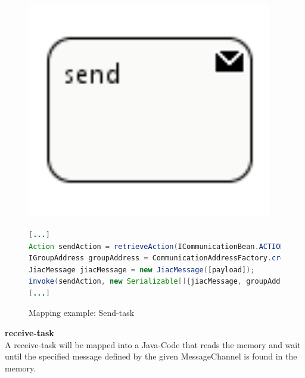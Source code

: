 \begin{figure}[h]
\begin{minipage}[c]{0.3\textwidth}
\includegraphics[width=0.95\textwidth]{images/mapping/sendTask.png}
\end{minipage}
\begin{minipage}[c]{0.7\textwidth}
\begin{lstlisting}[language=Java]
[...]
Action sendAction = retrieveAction(ICommunicationBean.ACTION_SEND);
IGroupAddress groupAddress = CommunicationAddressFactory.createGroupAddress([address]);
JiacMessage jiacMessage = new JiacMessage([payload]);
invoke(sendAction, new Serializable[]{jiacMessage, groupAddress});
[...]
\end{lstlisting}
\end{minipage}
\caption{Mapping example: Send-task}%
\label{fig:send_task}%
\end{figure}


\textbf{receive-task}\\
A receive-task will be mapped into a Java-Code that reads the memory and wait until the specified message defined by the given MessageChannel is found in the memory. \\

